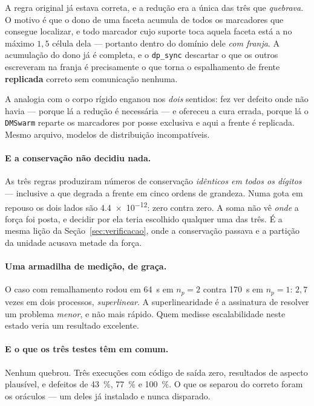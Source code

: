 A regra original j\'a estava correta, e a redu\c{c}\~ao era a \'unica das tr\^es
que \emph{quebrava}. O motivo \'e que o dono de uma faceta acumula de todos os
marcadores que consegue localizar, e todo marcador cujo suporte toca aquela faceta
est\'a a no m\'aximo $1{,}5$ c\'elula dela --- portanto dentro do dom\'inio dele
\emph{com franja}. A acumula\c{c}\~ao do dono j\'a \'e completa, e o
\texttt{dp\_sync} descartar o que os outros escreveram na franja \'e precisamente
o que torna o espalhamento de frente \textbf{replicada} correto sem
comunica\c{c}\~ao nenhuma.

A analogia com o corpo r\'igido enganou nos \emph{dois} sentidos: fez ver defeito
onde n\~ao havia --- porque l\'a a redu\c{c}\~ao \'e necess\'aria --- e ofereceu a
cura errada, porque l\'a o \texttt{DMSwarm} reparte os marcadores por posse
exclusiva e aqui a frente \'e replicada. Mesmo arquivo, modelos de
distribui\c{c}\~ao incompat\'iveis.

\paragraph{E a conserva\c{c}\~ao n\~ao decidiu nada.} As tr\^es regras produziram
n\'umeros de conserva\c{c}\~ao \emph{id\^enticos em todos os d\'igitos} ---
inclusive a que degrada a frente em cinco ordens de grandeza. Numa gota em repouso
os dois lados s\~ao \num{4.4e-12}: zero contra zero. A soma n\~ao v\^e \emph{onde}
a for\c{c}a foi posta, e decidir por ela teria escolhido qualquer uma das tr\^es.
\'E a mesma li\c{c}\~ao da Se\c{c}\~ao~\ref{sec:verificacao}, onde a
conserva\c{c}\~ao passava e a parti\c{c}\~ao da unidade acusava metade da
for\c{c}a.

\paragraph{Uma armadilha de medi\c{c}\~ao, de gra\c{c}a.} O caso com remalhamento
rodou em \SI{64}{\second} em $n_p=2$ contra \SI{170}{\second} em $n_p=1$: $2{,}7$
vezes em dois processos, \emph{superlinear}. A superlinearidade \'e a assinatura
de resolver um problema \emph{menor}, e n\~ao mais r\'apido. Quem medisse
escalabilidade neste estado veria um resultado excelente.

\paragraph{E o que os tr\^es testes t\^em em comum.} Nenhum quebrou. Tr\^es
execu\c{c}\~oes com c\'odigo de sa\'ida zero, resultados de aspecto plaus\'ivel,
e defeitos de \SI{43}{\percent}, \SI{77}{\percent} e \SI{100}{\percent}. O que os
separou do correto foram os or\'aculos --- um deles j\'a instalado e nunca
disparado.

